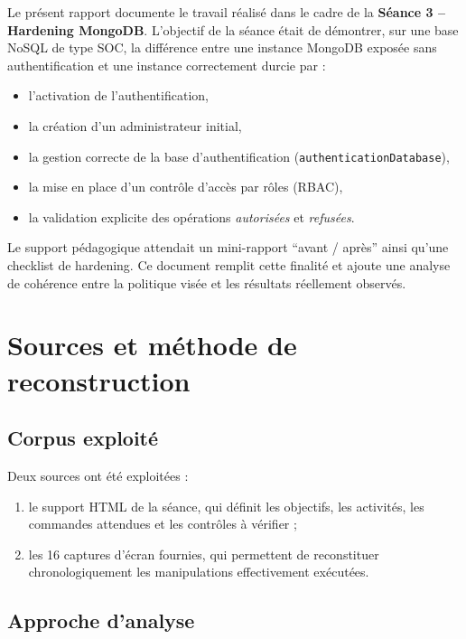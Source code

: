 \documentclass[11pt,a4paper]{article}
\begin{document}
Le présent rapport documente le travail réalisé dans le cadre de la \textbf{Séance 3 -- Hardening MongoDB}. L'objectif de la séance était de démontrer, sur une base NoSQL de type SOC, la différence entre une instance MongoDB exposée sans authentification et une instance correctement durcie par :
\begin{itemize}
  \item l'activation de l'authentification,
  \item la création d'un administrateur initial,
  \item la gestion correcte de la base d'authentification (\texttt{authenticationDatabase}),
  \item la mise en place d'un contrôle d'accès par rôles (RBAC),
  \item la validation explicite des opérations \emph{autorisées} et \emph{refusées}.
\end{itemize}

Le support pédagogique attendait un mini-rapport ``avant / après'' ainsi qu'une checklist de hardening. Ce document remplit cette finalité et ajoute une analyse de cohérence entre la politique visée et les résultats réellement observés.

\section{Sources et méthode de reconstruction}

\subsection{Corpus exploité}

Deux sources ont été exploitées :
\begin{enumerate}
  \item le support HTML de la séance, qui définit les objectifs, les activités, les commandes attendues et les contrôles à vérifier ;
  \item les 16 captures d'écran fournies, qui permettent de reconstituer chronologiquement les manipulations effectivement exécutées.
\end{enumerate}

\subsection{Approche d'analyse}
\end{document}
